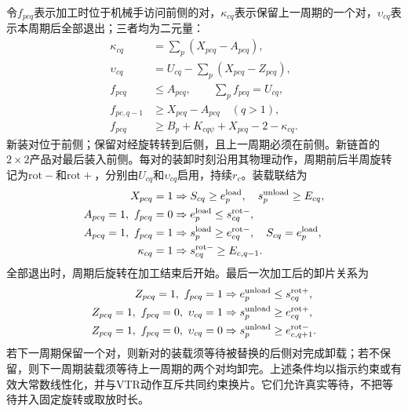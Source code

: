 \documentclass[final,5p,times,twocolumn]{elsarticle}
\begin{document}
令$f_{pcq}$表示加工时位于机械手访问前侧的对，$\kappa_{cq}$表示保留上一周期的一个对，$\upsilon_{cq}$表示本周期后全部退出；三者均为二元量：
\begin{equation}
\begin{aligned}
\kappa_{cq}&=\sum_p(X_{pcq}-A_{pcq}),\\
\upsilon_{cq}&=U_{cq}-\sum_p(X_{pcq}-Z_{pcq}),\\
f_{pcq}&\le A_{pcq},\qquad\sum_pf_{pcq}=U_{cq},\\
f_{pc,q-1}&\ge X_{pcq}-A_{pcq}\quad(q>1),\\
f_{pcq}&\ge B_p+K_{cq\psi}+X_{pcq}-2-\kappa_{cq}.
\end{aligned}
\label{eq:cycle-side-cn}
\end{equation}
新装对位于前侧；保留对经旋转转到后侧，且上一周期必须在前侧。新链首的$2\times2$产品对最后装入前侧。每对的装卸时刻沿用其物理动作，周期前后半周旋转记为$\mathrm{rot-}$和$\mathrm{rot+}$，分别由$U_{cq}$和$\upsilon_{cq}$启用，持续$r_c$。装载联结为
\begin{equation}
\begin{aligned}
X_{pcq}=1&\Rightarrow S_{cq}\ge e^{\rm load}_p,\quad
s^{\rm unload}_p\ge E_{cq},\\
A_{pcq}=1,\ f_{pcq}=0&\Rightarrow e^{\rm load}_p\le s^{\rm rot-}_{cq},\\
A_{pcq}=1,\ f_{pcq}=1&\Rightarrow s^{\rm load}_p\ge e^{\rm rot-}_{cq},\quad
S_{cq}=e^{\rm load}_p,\\
\kappa_{cq}=1&\Rightarrow s^{\rm rot-}_{cq}\ge E_{c,q-1}.
\end{aligned}
\label{eq:cycle-load-cn}
\end{equation}
全部退出时，周期后旋转在加工结束后开始。最后一次加工后的卸片关系为
\begin{equation}
\begin{aligned}
Z_{pcq}=1,\ f_{pcq}=1&\Rightarrow e^{\rm unload}_p\le s^{\rm rot+}_{cq},\\
Z_{pcq}=1,\ f_{pcq}=0,\ \upsilon_{cq}=1
&\Rightarrow s^{\rm unload}_p\ge e^{\rm rot+}_{cq},\\
Z_{pcq}=1,\ f_{pcq}=0,\ \upsilon_{cq}=0
&\Rightarrow s^{\rm unload}_p\ge e^{\rm rot-}_{c,q+1}.
\end{aligned}
\label{eq:cycle-unload-cn}
\end{equation}
若下一周期保留一个对，则新对的装载须等待被替换的后侧对完成卸载；若不保留，则下一周期装载须等待上一周期的两个对均卸完。上述条件均以指示约束或有效大常数线性化，并与VTR动作互斥共同约束换片。它们允许真实等待，不把等待并入固定旋转或取放时长。
\end{document}
